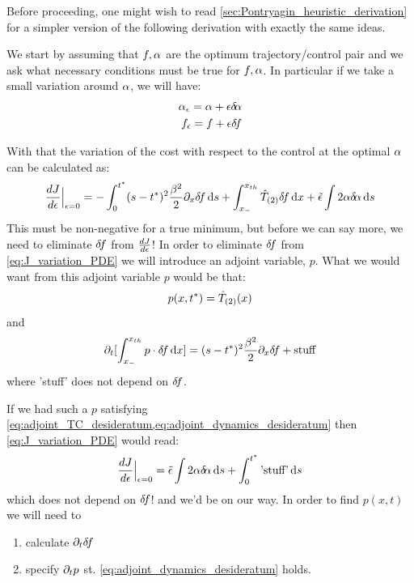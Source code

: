 \documentclass{article}
\begin{document}
Before proceeding, one might wish to read
\cref{sec:Pontryagin_heuristic_derivation} for a simpler version of the
following derivation with exactly the same ideas.

We start by assuming that $f,{\alpha}$ are the optimum trajectory/control pair and we
ask what necessary conditions must be true for $f,{\alpha}$. In particular if we take
a small variation around ${\alpha}$, we will have:
\begin{align*}
{\alpha}_{\epsilon} = {\alpha} + {\epsilon} { \delta\! {\alpha}}
\\
f_{\epsilon} = f + {\epsilon} { \delta\! f}
\end{align*}

With that the variation of the cost with respect to the control at the optimal
${\alpha}$ can be calculated as:
\begin{equation}
\frac {dJ}{d{\epsilon}} \Big|_{{\epsilon} = 0} =
- \int_0^{ t^* } (s-{ t^* })^2 \frac {{\beta}^2}{2} {\partial}_x  { \delta\! f} \, \mathrm{d} s  
+ \int_{ x_{-} }^{ x_{th} } { \hat{T}_{(2)} }{ \delta\! f}\, \mathrm{d} x
+ \tilde{{\epsilon}} \int 2 {\alpha} { \delta\! {\alpha}} \, \mathrm{d} s  
\label{eq:J_variation_PDE}
\end{equation}
This must be non-negative for a true minimum, but before we can say more, we
need to eliminate ${ \delta\! f}$ from $\frac {dJ}{d{\epsilon}}$! In order to eliminate ${ \delta\! f}$
from \cref{eq:J_variation_PDE} we will introduce an adjoint variable, $p$. What
we would want from this adjoint variable $p$ would be that:
\begin{equation}
p(x,{ t^* }) = { \hat{T}_{(2)} }(x)
\label{eq:adjoint_TC_desideratum}
\end{equation}  
and 
\begin{equation}
{\partial}_t [ \int_{ x_{-} }^{ x_{th} }  p \cdot{ \delta\! f} \, \mathrm{d} x ] = (s-{ t^* })^2 \frac {{\beta}^2}{2} {\partial}_x 
{ \delta\! f}
 + \text{stuff}
\label{eq:adjoint_dynamics_desideratum}
\end{equation}
where 'stuff' does not depend on ${ \delta\! f}$.

If we had such a $p$ satisfying
\cref{eq:adjoint_TC_desideratum,eq:adjoint_dynamics_desideratum} then
\cref{eq:J_variation_PDE} would read:
\begin{equation}
\frac {dJ}{d{\epsilon}} \Big|_{{\epsilon} = 0} =
\tilde{{\epsilon}} \int 2 {\alpha}{ \delta\! {\alpha}}  \, \mathrm{d} s +   \int_0^{ t^* }  \text{'stuff'}\, \mathrm{d} s
\label{eq:J_variation_PDE_nodf}
\end{equation}
which does not depend on ${ \delta\! f}$! and we'd be on our way. In order to find
$p(x,t)$ we will need to
\begin{enumerate}
  \item calculate ${\partial}_t { \delta\! f}$
  \item specify ${\partial}_t p $ st. \cref{eq:adjoint_dynamics_desideratum} holds.
\end{enumerate}
\end{document}

